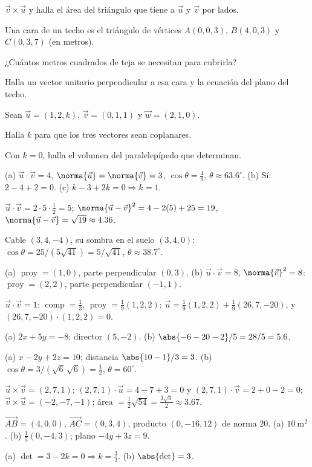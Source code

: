 \documentclass[11pt,a4paper]{article}
\newcommand{\proy}{\operatorname{proy}}
\newcommand{\comp}{\operatorname{comp}}
\newcommand{\vu}{\vec{u}}\def\vv{\vec{v}}\newcommand{\vw}{\vec{w}}\newcommand{\vn}{\vec{n}}
\begin{document}
\begin{ejercicios}
  $\vv\times\vu$ y halla el área del triángulo que tiene a $\vu$ y $\vv$ por lados.
\item Una cara de un techo es el triángulo de vértices $A(0,0,3)$, $B(4,0,3)$ y $C(0,3,7)$ (en metros).
  \begin{ejercicios}
  \item ¿Cuántos metros cuadrados de teja se necesitan para cubrirla?
  \item Halla un vector unitario perpendicular a esa cara y la ecuación del plano del techo.
  \end{ejercicios}
\item Sean $\vu=(1,2,k)$, $\vv=(0,1,1)$ y $\vw=(2,1,0)$.
  \begin{ejercicios}
  \item Halla $k$ para que los tres vectores sean coplanares.
  \item Con $k=0$, halla el volumen del paralelepípedo que determinan.
  \end{ejercicios}
\end{ejercicios}

\respuestas
\begin{respuestascortas}\raggedright
\begin{soluciones}
\item (a) $\vu\cdot\vv=4$, $\norma{\vu}=\norma{\vv}=3$, $\cos\theta=\tfrac49$, $\theta\approx63.6^\circ$.
  (b) Sí: $2-4+2=0$. (c) $k-3+2k=0\Rightarrow k=1$.
\item $\vu\cdot\vv=2\cdot5\cdot\tfrac12=5$; $\norma{\vu-\vv}^2=4-2(5)+25=19$, $\norma{\vu-\vv}=\sqrt{19}\approx4.36$.
\item Cable $(3,4,-4)$, su sombra en el suelo $(3,4,0)$: $\cos\theta=25/(5\sqrt{41})=5/\sqrt{41}$, $\theta\approx38.7^\circ$.
\item (a) $\proy=(1,0)$, parte perpendicular $(0,3)$. (b) $\vu\cdot\vv=8$, $\norma{\vv}^2=8$: $\proy=(2,2)$, parte perpendicular $(-1,1)$.
\item $\vu\cdot\vv=1$: $\comp=\tfrac13$, $\proy=\tfrac19(1,2,2)$;
  $\vu=\tfrac19(1,2,2)+\tfrac19(26,7,-20)$, y $(26,7,-20)\cdot(1,2,2)=0$.
\item (a) $2x+5y=-8$; director $(5,-2)$. (b) $\abs{-6-20-2}/5=28/5=5.6$.
\item (a) $x-2y+2z=10$; distancia $\abs{10-1}/3=3$. (b) $\cos\theta=3/(\sqrt6\,\sqrt6)=\tfrac12$, $\theta=60^\circ$.
\item $\vu\times\vv=(2,7,1)$; $(2,7,1)\cdot\vu=4-7+3=0$ y $(2,7,1)\cdot\vv=2+0-2=0$; $\vv\times\vu=(-2,-7,-1)$;
  área $=\tfrac12\sqrt{54}=\tfrac{3\sqrt6}{2}\approx3.67$.
\item $\overrightarrow{AB}=(4,0,0)$, $\overrightarrow{AC}=(0,3,4)$, producto $(0,-16,12)$ de norma $20$.
  (a) $\SI{10}{\metre\squared}$. (b) $\tfrac15(0,-4,3)$; plano $-4y+3z=9$.
\item (a) $\det=3-2k=0\Rightarrow k=\tfrac32$. (b) $\abs{\det}=3$.
\end{soluciones}
\end{respuestascortas}
\end{document}
